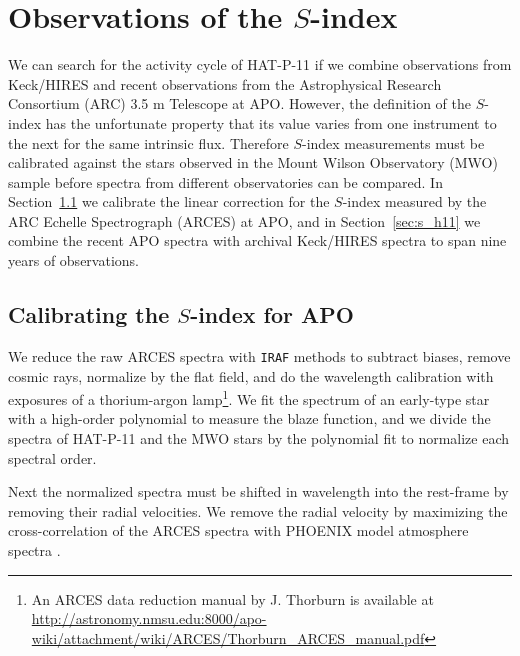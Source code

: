 \section{Observations of the $S$-index} \label{sec:sindex}

We can search for the activity cycle of HAT-P-11 if we combine observations from Keck/HIRES and recent observations from the Astrophysical Research Consortium (ARC) 3.5 m Telescope at APO. However, the definition of the $S$-index has the unfortunate property that its value varies from one instrument to the next for the same intrinsic flux. Therefore $S$-index measurements must be calibrated against the stars observed in the Mount Wilson Observatory (MWO) sample before spectra from different observatories can be compared. In Section~\ref{sec:s_apo} we calibrate the linear correction for the $S$-index measured by the ARC Echelle Spectrograph (ARCES) at APO, and in Section~\ref{sec:s_h11} we combine the recent APO spectra with archival Keck/HIRES spectra to span nine years of observations.

\subsection{Calibrating the $S$-index for APO} \label{sec:s_apo}

We reduce the raw ARCES spectra with \texttt{IRAF} methods to subtract biases, remove cosmic rays, normalize by the flat field, and do the wavelength calibration with exposures of a thorium-argon lamp\footnote{An ARCES data reduction manual by J. Thorburn is available at \url{http://astronomy.nmsu.edu:8000/apo-wiki/attachment/wiki/ARCES/Thorburn_ARCES_manual.pdf}}. We fit the spectrum of an early-type star with a high-order polynomial to measure the blaze function, and we divide the spectra of HAT-P-11 and the MWO stars by the polynomial fit to normalize each spectral order.

Next the normalized spectra must be shifted in wavelength into the rest-frame by removing their radial velocities. We remove the radial velocity by maximizing the cross-correlation of the ARCES spectra with PHOENIX model atmosphere spectra \citep{Husser2013}.

